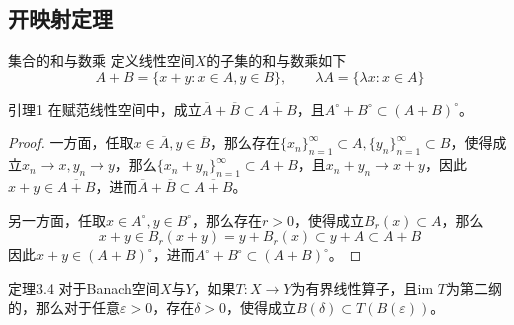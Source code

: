 \documentclass[lang = cn, scheme = chinese, thmcnt = section]{elegantbook}
\newcommand{\sub}{\subset}             %
\newcommand{\im}{\text{im }}           %
\begin{document}
\subsection{开映射定理}

\begin{definition}{集合的和与数乘}
	定义线性空间$X$的子集的和与数乘如下
	$$
	A+B=\{ x+y:x\in A,y\in B \},\qquad \lambda A=\{ \lambda x:x\in A \}
	$$
\end{definition}

\begin{lemma}{}{引理1}
	在赋范线性空间中，成立$\overline{A}+\overline{B}\sub\overline{A+B}$，且$A^\circ +B^\circ\sub (A+B)^\circ$。
\end{lemma}

\begin{proof}
	一方面，任取$x\in\overline{A},y\in\overline{B}$，那么存在$\{x_n\}_{n=1}^{\infty}\sub A,\{y_n\}_{n=1}^{\infty}\sub B$，使得成立$x_n\to x,y_n\to y$，那么$\{ x_n+y_n \}_{n=1}^{\infty}\sub A+B$，且$x_n+y_n\to x+y$，因此$x+y\in\overline{A+B}$，进而$\overline{A}+\overline{B}\sub\overline{A+B}$。
	
	另一方面，任取$x\in A^\circ,y\in B^\circ$，那么存在$r>0$，使得成立$B_{r}(x)\sub A$，那么
	$$
	x+y\in B_r(x+y)=y+B_r(x)\sub y+A\sub A+B
	$$
	因此$x+y\in (A+B)^\circ$，进而$A^\circ +B^\circ\sub (A+B)^\circ$。
\end{proof}

\begin{theorem}{}{定理3.4}
	对于Banach空间$X$与$Y$，如果$T:X\to Y$为有界线性算子，且$\im T$为第二纲的，那么对于任意$\varepsilon>0$，存在$\delta>0$，使得成立$B(\delta)\sub T(B(\varepsilon))$。
\end{theorem}
\end{document}
